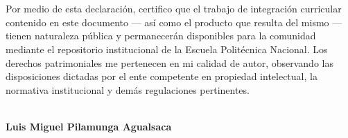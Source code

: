 \titlespacing*{\chapter}{0pt}{70pt}{15pt} 
\chapter*{}
Por medio de esta declaración, certifico que el trabajo de integración curricular contenido en este documento — así como el producto que resulta del mismo — tienen naturaleza pública y permanecerán disponibles para la comunidad mediante el repositorio institucional de la Escuela Politécnica Nacional. Los derechos patrimoniales me pertenecen en mi calidad de autor, observando las disposiciones dictadas por el ente competente en propiedad intelectual, la normativa institucional y demás regulaciones pertinentes.



\vspace{2.5cm}
\makebox[2.82in]{\hrulefill}\\
{\bfseries Luis Miguel Pilamunga Agualsaca}
